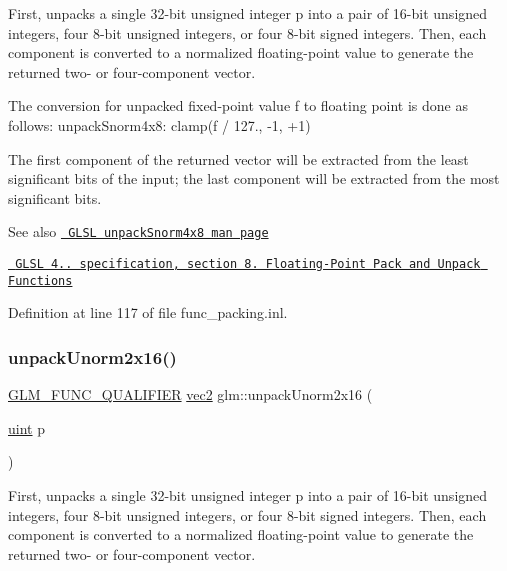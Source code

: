 First, unpacks a single 32-\/bit unsigned integer p into a pair of 16-\/bit unsigned integers, four 8-\/bit unsigned integers, or four 8-\/bit signed integers. Then, each component is converted to a normalized floating-\/point value to generate the returned two-\/ or four-\/component vector.

The conversion for unpacked fixed-\/point value f to floating point is done as follows\+: unpack\+Snorm4x8\+: clamp(f / 127., -\/1, +1)

The first component of the returned vector will be extracted from the least significant bits of the input; the last component will be extracted from the most significant bits.

\begin{DoxySeeAlso}{See also}
\href{http://www.opengl.org/sdk/docs/manglsl/xhtml/unpackSnorm4x8.xml}{\texttt{ G\+L\+SL unpack\+Snorm4x8 man page}} 

\href{http://www.opengl.org/registry/doc/GLSLangSpec.4.20.8.pdf}{\texttt{ G\+L\+SL 4.. specification, section 8. Floating-\/\+Point Pack and Unpack Functions}} 
\end{DoxySeeAlso}


Definition at line 117 of file func\+\_\+packing.\+inl.

\mbox{\label{group__core__func__packing_ga11776a74e1885a14e1295d6e917a9ae2}} 
\subsubsection{\texorpdfstring{unpackUnorm2x16()}{unpackUnorm2x16()}}
{\footnotesize\ttfamily \mbox{\hyperlink{setup_8hpp_a33fdea6f91c5f834105f7415e2a64407}{G\+L\+M\+\_\+\+F\+U\+N\+C\+\_\+\+Q\+U\+A\+L\+I\+F\+I\+ER}} \mbox{\hyperlink{group__core__types_gaa1618f51db67eaa145db101d8c8431d8}{vec2}} glm\+::unpack\+Unorm2x16 (\begin{DoxyParamCaption}\item[{\mbox{\hyperlink{group__core__precision_ga4fd29415871152bfb5abd588334147c8}{uint}}}]{p }\end{DoxyParamCaption})}

First, unpacks a single 32-\/bit unsigned integer p into a pair of 16-\/bit unsigned integers, four 8-\/bit unsigned integers, or four 8-\/bit signed integers. Then, each component is converted to a normalized floating-\/point value to generate the returned two-\/ or four-\/component vector.

